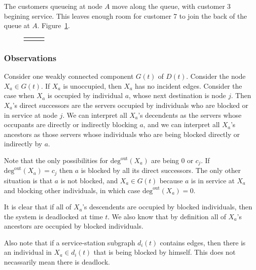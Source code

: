 \documentclass{article}
\begin{document}
The customers queueing at node $A$ move along the queue, with customer 3 begining service.
This leaves enough room for customer 7 to join the back of the queue at $A$. Figure~\ref{fig:general_builddown_4}.

\begin{figure}[H]
  \begin{center}
    \begin{tabular}{ c c c }
       & \hspace{0.1\textwidth} &
       \\
  \end{tabular}
  \end{center}
  \caption{}
  \label{fig:general_builddown_4}
\end{figure}

\subsubsection*{Observations}

Consider one weakly connected component $G(t)$ of $D(t)$.
Consider the node $X_a \in G(t)$. If $X_a$ is unoccupied, then $X_a$ has no incident edges.
Consider the case when $X_a$ is occupied by individual $a$, whose next destination is node $j$.
Then $X_a$'s direct successors are the servers occupied by individuals who are blocked or in service at node $j$.
We can interpret all $X_a$'s decendents as the servers whose occupants are directly or indirectly blocking $a$, and we can interpret all $X_a$'s ancestors as those servers whose individuals who are being blocked directly or indirectly by $a$.

Note that the only possibilities for $\text{deg}^{\text{out}}(X_a)$ are being 0 or $c_j$.
If $\text{deg}^{\text{out}}(X_a) = c_j$ then $a$ is blocked by all its direct successors.
The only other situation is that $a$ is not blocked, and $X_a \in G(t)$ because $a$ is in service at $X_a$ and blocking other individuals, in which case $\text{deg}^{\text{out}}(X_a) = 0$.

It is clear that if all of $X_a$'s descendents are occupied by blocked individuals, then the system is deadlocked at time $t$.
We also know that by definition all of $X_a$'s ancestors are occupied by blocked individuals.

Also note that if a service-station subgraph $d_i(t)$ contains edges, then there is an individual in $X_a \in d_i(t)$ that is being blocked by himself.
This does not necassarily mean there is deadlock.
\end{document}
